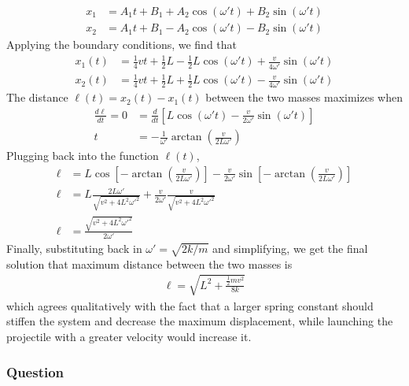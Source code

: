 \begin{align*}
    x_1 &= A_1t + B_1 + A_2\cos({\omega}'t) + B_2\sin({\omega}'t) \\
    x_2 &= A_1t + B_1 - A_2\cos({\omega}'t) - B_2\sin({\omega}'t)
\end{align*}
Applying the boundary conditions, we find that
\begin{align*}
    x_1(t) &= \frac 14 vt + \frac 12 L - \frac 12 L\cos({\omega}'t) +
	\frac{v}{4{\omega}'}\sin({\omega}'t) \\
    x_2(t) &= \frac 14 vt + \frac 12 L + \frac 12 L\cos({\omega}'t) -
	\frac{v}{4{\omega}'}\sin({\omega}'t)
\end{align*}
The distance $\ell (t) = x_2(t) - x_1(t)$ between the two masses maximizes when
\begin{align*}
    \frac{d\ell }{dt} = 0 &= \frac{d}{dt} \left[ L\cos({\omega}'t) -
	\frac{v}{2{\omega}'}\sin({\omega}'t) \right] \\
    t &= -\frac{1}{{\omega}'} \arctan (\frac{v}{2L{\omega}'})
\end{align*}
Plugging back into the function $\ell (t)$,
\begin{align*}
    \ell  &= L\cos \left[ -\arctan (\frac{v}{2L{\omega}'}) \right] - \frac{v}{2{\omega}'}
	\sin \left[ -\arctan (\frac{v}{2L{\omega}'}) \right] \\
    \ell  &= L \frac{2L{\omega}'}{\sqrt{v^2 + 4L^2 {{\omega}'}^2}} + \frac{v}{2{\omega}'}
	\frac{v}{\sqrt{v^2 + 4L^2 {{\omega}'}^2}} \\
    \ell  &= \frac{\sqrt{v^2 + 4L^2 {{\omega}'}^2}}{2{\omega}'}
\end{align*}
Finally, substituting back in ${\omega}' = \sqrt{2k/m}$ and simplifying, we get the
final solution that maximum distance between the two masses is
\begin{align}
    \boxed{
    \ell  = \sqrt{L^2 + \frac{\frac 12 mv^2}{8k}}
    }
\end{align}
which agrees qualitatively with the fact that a larger spring constant should
stiffen the system and decrease the maximum displacement, while launching the
projectile with a greater velocity would increase it.

\subsubsection{Question}

